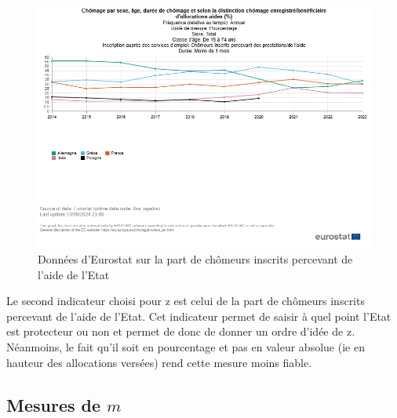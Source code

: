 \documentclass{article}
\begin{document}
  \begin{figure}[H]
    \centering
    \begin{minipage}{0.8\textwidth}
        \centering
        \includegraphics[width=\textwidth]{"allocations.png"}
        \caption{Données d'Eurostat sur la part de chômeurs inscrits percevant de l'aide de l'Etat}
    \end{minipage}
  \end{figure}
\vspace{0.5cm}

Le second indicateur choisi pour z est celui de la part de chômeurs inscrits percevant de l'aide de l'Etat. Cet indicateur permet de saisir à quel point l'Etat est protecteur ou non et permet de donc de donner un ordre d'idée de z. Néanmoins, le fait qu'il soit en pourcentage et pas en valeur absolue (ie en hauteur des allocations versées) rend cette mesure moins fiable.


\subsection{Mesures de $m$}
\end{document}
